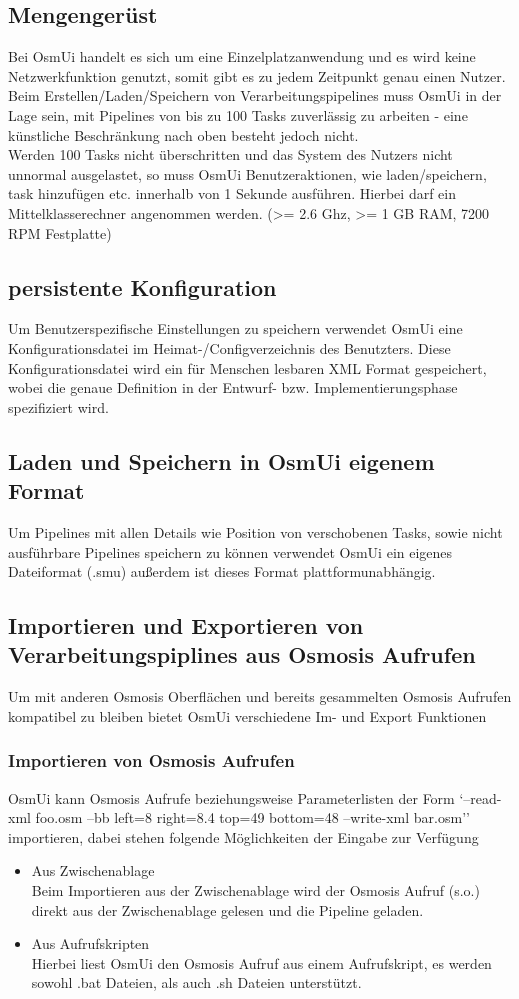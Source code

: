 \documentclass[a4paper,12pt]{scrartcl}
\begin{document}
\subsection{Mengengerüst}
Bei OsmUi handelt es sich um eine Einzelplatzanwendung und es wird keine Netzwerkfunktion genutzt, somit gibt es zu jedem Zeitpunkt genau einen Nutzer.\\
Beim Erstellen/Laden/Speichern von Verarbeitungspipelines muss OsmUi in der Lage sein, mit Pipelines von bis zu 100 Tasks zuverlässig zu arbeiten -
eine künstliche Beschränkung nach oben besteht jedoch nicht.\\
Werden 100 Tasks nicht überschritten und das System des Nutzers nicht unnormal ausgelastet, so muss OsmUi Benutzeraktionen, wie laden/speichern, task hinzufügen etc.
innerhalb von 1 Sekunde ausführen. Hierbei darf ein Mittelklasserechner angenommen werden. (>= 2.6 Ghz, >= 1 GB RAM, 7200 RPM Festplatte)
\subsection{persistente Konfiguration}
Um Benutzerspezifische Einstellungen zu speichern verwendet OsmUi eine Konfigurationsdatei im Heimat-/Configverzeichnis des Benutzters.
Diese Konfigurationsdatei wird ein für Menschen lesbaren XML Format gespeichert, wobei die genaue Definition in der Entwurf- bzw. Implementierungsphase
spezifiziert wird. 
\subsection{Laden und Speichern in OsmUi eigenem Format}
Um Pipelines mit allen Details wie Position von verschobenen Tasks, sowie nicht ausführbare Pipelines speichern zu können verwendet OsmUi ein eigenes Dateiformat
(.smu) außerdem ist dieses Format plattformunabhängig.

\subsection{Importieren und Exportieren von Verarbeitungspiplines aus Osmosis Aufrufen}
Um mit anderen Osmosis Oberflächen und bereits gesammelten Osmosis Aufrufen kompatibel zu bleiben bietet OsmUi verschiedene Im- und Export Funktionen
\subsubsection{Importieren von Osmosis Aufrufen}
OsmUi kann Osmosis Aufrufe beziehungsweise Parameterlisten der Form `--read-xml foo.osm --bb left=8 right=8.4 top=49 bottom=48 --write-xml bar.osm'' 
importieren, dabei stehen folgende Möglichkeiten der Eingabe zur Verfügung
\begin{itemize}
  \item Aus Zwischenablage\\
  Beim Importieren aus der Zwischenablage wird der Osmosis Aufruf (s.o.) direkt aus der Zwischenablage gelesen und die Pipeline geladen.
  \item Aus Aufrufskripten\\
  Hierbei liest OsmUi den Osmosis Aufruf aus einem Aufrufskript, es werden sowohl .bat Dateien, als auch .sh Dateien unterstützt.
\end{itemize}
\end{document}
